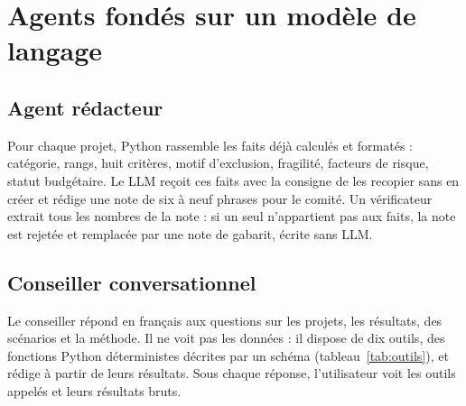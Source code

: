 \section{Agents fondés sur un modèle de langage}

\subsection{Agent rédacteur}

Pour chaque projet, Python rassemble les \og faits \fg{} déjà calculés et formatés : catégorie, rangs, huit critères,
motif d'exclusion, fragilité, facteurs de risque, statut budgétaire. Le LLM reçoit ces faits avec la consigne de les
recopier sans en créer et rédige une note de six à neuf phrases pour le comité. Un vérificateur extrait tous les nombres
de la note : si un seul n'appartient pas aux faits, la note est rejetée et remplacée par une note de gabarit, écrite
sans LLM.

\subsection{Conseiller conversationnel}

Le conseiller répond en français aux questions sur les projets, les résultats, des scénarios et la méthode. Il ne voit
pas les données : il dispose de dix outils, des fonctions Python déterministes décrites par un schéma
(tableau~\ref{tab:outils}), et rédige à partir de leurs résultats. Sous chaque réponse, l'utilisateur voit les outils
appelés et leurs résultats bruts.

